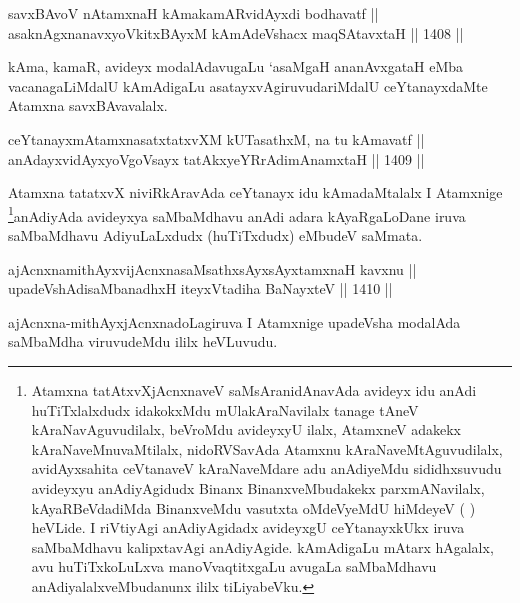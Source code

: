 \begin{shl}
savxBAvoV nA\s \s tamxnaH kAmakamARvidAyxdi bodhavatf || \\
asaknAgxnanavxyoVkitxBAyxM kAmAdeVshacx maqSAtavxtaH \hfill || 1408 ||  
\end{shl}

\begin{artha}
kAma, kamaR, avideyx modalAdavugaLu `asaMgaH ananAvxgataH eMba vacanagaLiMdalU kAmAdigaLu asatayxvAgiruvudariMdalU ceYtanayxdaMte Atamxna savxBAvavalalx.
\end{artha}

\begin{shl}
ceYtanayxmAtamxnasatxtatxvXM kUTasathxM, na tu kAmavatf || \\
anAdayxvidAyxyoVgoV\s sayx tatAkxyeYRrAdimAnamxtaH \hfill || 1409 ||  
\end{shl}

\begin{artha}
Atamxna tatatxvX niviRkAravAda ceYtanayx idu kAmadaMtalalx I Atamxnige \footnote{Atamxna tatAtxvXjAcnxnaveV saMsAranidAnavAda avideyx idu anAdi huTiTxlalxdudx idakokxMdu mUlakAraNavilalx tanage tAneV kAraNavAguvudilalx, beVroMdu avideyxyU ilalx, AtamxneV adakekx kAraNaveMnuvaMtilalx, nidoRVSavAda Atamxnu kAraNaveMtAguvudilalx, avidAyxsahita ceVtanaveV kAraNaveMdare adu anAdiyeMdu sididhxsuvudu avideyxyu anAdiyAgidudx Binanx BinanxveMbudakekx parxmANavilalx, kAyaRBeVdadiMda BinanxveMdu vasutxta oMdeVyeMdU hiMdeyeV ( ) heVLide. I riVtiyAgi anAdiyAgidadx avideyxgU ceYtanayxkUkx iruva saMbaMdhavu kalipxtavAgi anAdiyAgide. kAmAdigaLu mAtarx hAgalalx, avu huTiTxkoLuLxva manoVvaqtitxgaLu avugaLa saMbaMdhavu anAdiyalalxveMbudanunx ililx tiLiyabeVku.}anAdiyAda avideyxya saMbaMdhavu anAdi adara kAyaRgaLoDane iruva saMbaMdhavu AdiyuLaLxdudx (huTiTxdudx) eMbudeV saMmata.
\end{artha}


\begin{shl}
ajAcnxnamithAyxvijAcnxnasaMsathxsAyxsAyx\s \s tamxnaH kavxnu || \\
upadeVshAdisaMbanadhxH iteyxVtadiha BaNayxteV \hfill || 1410 ||  
\end{shl}	

\begin{artha}
ajAcnxna-mithAyxjAcnxnadoLagiruva I Atamxnige upadeVsha modalAda saMbaMdha viruvudeMdu ililx heVLuvudu. 
\end{artha}


